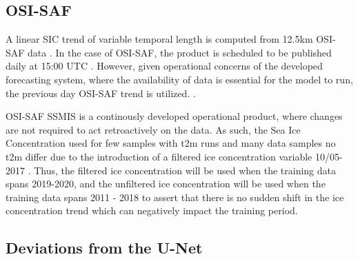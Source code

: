 \documentclass[../main/thesis]{subfiles}
\begin{document}
\subsection{OSI-SAF}
A linear SIC trend of variable temporal length is computed from 12.5km OSI-SAF data . In the case of OSI-SAF, the product is scheduled to be published daily at 15:00 UTC . However, given operational concerns of the developed forecasting system, where the availability of data is essential for the model to run, the previous day OSI-SAF trend is utilized. .

OSI-SAF SSMIS is a continously developed operational product, where changes are not required to act retroactively on the data. As such, the Sea Ice Concentration used for few samples with t2m runs and many data samples no t2m differ due to the introduction of a filtered ice concentration variable 10/05-2017 \cite{Tonboe2017}. Thus, the filtered ice concentration will be used when the training data spans 2019-2020, and the unfiltered ice concentration will be used when the training data spans 2011 - 2018 to assert that there is no sudden shift in the ice concentration trend which can negatively impact the training period.


\subsection{Deviations from the U-Net}



\end{document}
